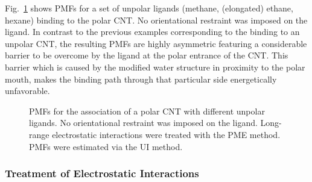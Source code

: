 \documentclass[9pt,lessons,pubversion]{livecoms}
\begin{document}
Fig.~\ref{fig:polCNT_unpLig} shows PMFs for a set of unpolar ligands (methane, (elongated) ethane, hexane) binding to the polar CNT. 
No orientational restraint was imposed on the ligand.
In contrast to the previous examples corresponding to the binding to an unpolar CNT, the resulting PMFs are highly asymmetric featuring a considerable barrier to be overcome by the ligand at the polar entrance of the CNT. 
This barrier which is caused by the modified water structure in proximity to the polar mouth, makes the binding path through that particular side energetically unfavorable.
\begin{figure}
  \centering    
  \caption{
  PMFs for the association of a polar CNT with different unpolar ligands. No orientational restraint was imposed on the ligand. 
  Long-range electrostatic interactions were treated with the PME method. PMFs were estimated via the UI method.
  }
  \label{fig:polCNT_unpLig}
\end{figure}

\subsubsection*{Treatment of Electrostatic Interactions}
\end{document}
